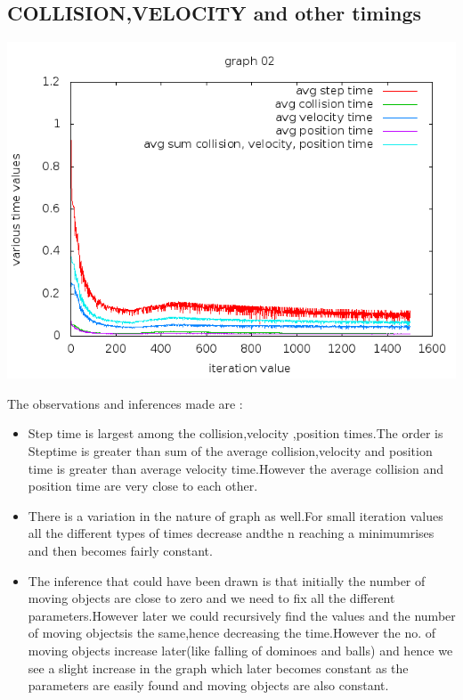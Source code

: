 \documentclass[11pt]{article}
\begin{document}
\subsection{COLLISION,VELOCITY and  other timings} 
\begin{center}
  \includegraphics[scale=0.75]{g03_plot02.png}
\end{center}
The observations and inferences made are :
\begin{itemize}
\item Step time is largest among the collision,velocity ,position times.The order is Steptime is greater than sum of the average collision,velocity and position time is greater than average velocity time.However the average collision and position time are very close to each other.
\item There is a variation in the nature of graph as well.For small iteration values all the different types of times decrease andthe n reaching a minimumrises and then becomes fairly constant.
\item The inference that could have been drawn is that initially the number of moving objects are close to zero and we need to fix all the different parameters.However later we could recursively find the values and the number of moving objectsis the same,hence decreasing the time.However the no. of moving objects increase later(like falling of dominoes and balls)  and hence we see a slight increase in the graph which later becomes constant as the parameters are easily found and moving objects are also constant. 
\end{itemize}
\end{document}
